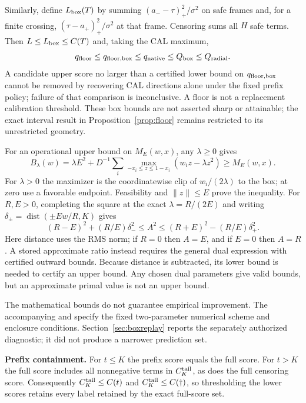 \documentclass[11pt]{article}
\theoremstyle{noteplain}
\newcommand{\norm}[1]{\lVert #1\rVert}
\newcommand{\dd}{\dagger}
\begin{document}
Similarly, define $L_{\rm box}(T)$ by summing $(a_--\tau)_+^2/\sigma^2$ on safe frames and, for a finite crossing, $(\tau-a_+)_+^2/\sigma^2$ at that frame. Censoring sums all $H$ safe terms. Then $L\le L_{\rm box}\le C(T)$ and, taking the CAL maximum,
\[
 q_{\rm floor}\le q_{\rm floor,box}\le q_{\rm native}
 \le Q_{\rm box}\le Q_{\rm radial}.
\]
A candidate upper score no larger than a certified lower bound on $q_{\rm floor,box}$ cannot be removed by recovering CAL directions alone under the fixed prefix policy; failure of that comparison is inconclusive. A floor is not a replacement calibration threshold. These box bounds are not asserted sharp or attainable; the exact interval result in Proposition~\ref{prop:floor} remains restricted to its unrestricted geometry.

For an operational upper bound on $M_E(w,x)$, any $\lambda\ge0$ gives
\[
 B_\lambda(w)=\lambda E^2+D^{-1}\!\sum_i
 \max_{-x_i\le z\le1-x_i}(w_i z-\lambda z^2)\ge M_E(w,x).
\]
For $\lambda>0$ the maximizer is the coordinatewise clip of $w_i/(2\lambda)$ to the box; at zero use a favorable endpoint. Feasibility and $\norm z\le E$ prove the inequality. For $R,E>0$, completing the square at the exact $\lambda=R/(2E)$ and writing $\delta_\pm=\operatorname{dist}(\pm Ew/R,K)$ gives
\[
 (R-E)^2+(R/E)\delta_-^2\le A^2
 \le(R+E)^2-(R/E)\delta_+^2.
\]
Here distance uses the RMS norm; if $R=0$ then $A=E$, and if $E=0$ then $A=R$. A stored approximate ratio instead requires the general dual expression with certified outward bounds. Because distance is subtracted, its lower bound is needed to certify an upper bound. Any chosen dual parameters give valid bounds, but an approximate primal value is not an upper bound.

The mathematical bounds do not guarantee empirical improvement. The accompanying  and  specify the fixed two-parameter numerical scheme and enclosure conditions. Section~\ref{sec:boxreplay} reports the separately authorized diagnostic; it did not produce a narrower prediction set.

\textbf{Prefix containment.} For $t\le K$ the prefix score equals the full score. For $t>K$ the full score includes all nonnegative terms in $C_K^{\rm tail}$, as does the full censoring score. Consequently $C_K^{\rm tail}\le C(t)$ and $C_K^{\rm tail}\le C(\dd)$, so thresholding the lower scores retains every label retained by the exact full-score set.
\end{document}
